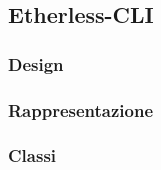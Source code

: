 \subsection{Etherless-CLI}
\subsubsection{Design}
\subsubsection{Rappresentazione}
\subsubsection{Classi}

